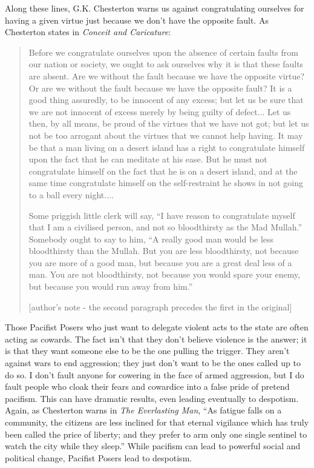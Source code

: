 Along these lines, G.K. Chesterton warns us against congratulating
ourselves for having a given virtue just because we don’t have the
opposite fault. As Chesterton states in \textit{Conceit and
Caricature}:

\begin{quote}
Before we congratulate ourselves upon the absence of certain faults from
our nation or society, we ought to ask ourselves why it is that these
faults are absent. Are we without the fault because we have the
opposite virtue? Or are we without the fault because we have the
opposite fault? It is a good thing assuredly, to be innocent of any
excess; but let us be sure that we are not innocent of excess merely by
being guilty of defect... Let us then, by all means, be proud of the
virtues that we have not got; but let us not be too arrogant about the
virtues that we cannot help having. It may be that a man living on a
desert island has a right to congratulate himself upon the fact that he
can meditate at his ease. But he must not congratulate himself on the
fact that he is on a desert island, and at the same time congratulate
himself on the self-restraint he shows in not going to a ball every
night....

Some priggish little clerk will say, ``I have reason to
congratulate myself that I am a civilised person, and not so
bloodthirsty as the Mad Mullah.'' Somebody ought to say to
him, ``A really good man would be less bloodthirsty than
the Mullah. But you are less bloodthirsty, not because you are more of
a good man, but because you are a great deal less of a man. You are not
bloodthirsty, not because you would spare your enemy, but because you
would run away from him.''

[author’s note - the second paragraph precedes the first in the
original]
\end{quote}

Those Pacifist Posers who just want to delegate violent acts to the
state are often acting as cowards. The fact isn’t that they don’t
believe violence is the answer; it is that they want someone else to be
the one pulling the trigger. They aren’t against wars to end
aggression; they just don’t want to be the ones called up to do so. I
don’t fault anyone for cowering in the face of armed aggression, but I
do fault people who cloak their fears and cowardice into a false pride
of pretend pacifism. This can have dramatic results, even leading
eventually to despotism. Again, as Chesterton warns in \textit{The
Everlasting Man}, “As fatigue falls on a community, the citizens are
less inclined for that eternal vigilance which has truly been called
the price of liberty; and they prefer to arm only one single sentinel
to watch the city while they sleep.”  While pacifism can lead to
powerful social and political change, Pacifist Posers lead to
despotism.

